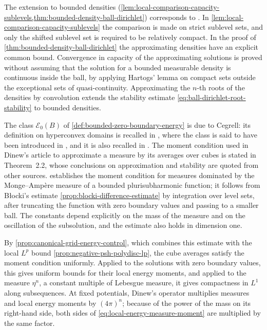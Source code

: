 The extension to bounded densities (\cref{lem:local-comparison-capacity-sublevels,thm:bounded-density-ball-dirichlet}) corresponds to \cite[Theorem 5.17 and Lemma 5.18]{GZ17}. In \cref{lem:local-comparison-capacity-sublevels} the comparison is made on strict sublevel sets, and only the shifted sublevel set is required to be relatively compact. In the proof of \cref{thm:bounded-density-ball-dirichlet} the approximating densities have an explicit common bound. Convergence in capacity of the approximating solutions is proved without assuming that the solution for a bounded measurable density is continuous inside the ball, by applying Hartogs' lemma on compact sets outside the exceptional sets of quasi-continuity. Approximating the $n$-th roots of the densities by convolution extends the stability estimate \eqref{eq:ball-dirichlet-root-stability} to bounded densities.

The class $\mathcal E_0(B)$ of \cref{def:bounded-zero-boundary-energy} is due to Cegrell: its definition on hyperconvex domains is recalled in \cite[Section~3]{Ceg04}, where the class is said to have been introduced in \cite{Ceg98}, and it is also recalled in \cite[Section 2]{Din07MixedV1}. The moment condition used in Dinew's article to approximate a measure by its averages over cubes is stated in Theorem~2.2, whose conclusions on approximation and stability are quoted from other sources.  establishes the moment condition for measures dominated by the Monge--Amp\`ere measure of a bounded plurisubharmonic function; it follows from B\l{}ocki's estimate \cref{prop:blocki-difference-estimate} by integration over level sets, after truncating the function with zero boundary values and passing to a smaller ball. The constants depend explicitly on the mass of the measure and on the oscillation of the subsolution, and the estimate also holds in dimension one.

By \cref{prop:canonical-grid-energy-control}, which combines this estimate with the local $L^p$ bound \cref{prop:negative-psh-polydisc-lp}, the cube averages satisfy the moment condition uniformly. Applied to the solutions with zero boundary values, this gives uniform bounds for their local energy moments, and applied to the measure $\eta^n$, a constant multiple of Lebesgue measure, it gives compactness in $L^1$ along subsequences. At fixed potentials, Dinew's operator multiplies measures and local energy moments by $(4\pi)^n$; because of the power of the mass on its right-hand side, both sides of \eqref{eq:local-energy-measure-moment} are multiplied by the same factor.

